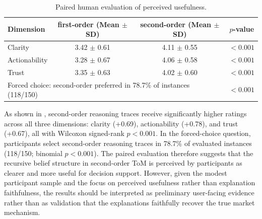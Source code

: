 \documentclass[a4paper,fleqn,doubleblind]{cas-sc}
\begin{document}
\begin{table}[htbp]
\centering
\small
\renewcommand{\arraystretch}{0.8}
\caption{Paired human evaluation of perceived usefulness.}
\begin{tabular}{lccc}
\toprule
\textbf{Dimension} & \textbf{first-order (Mean $\pm$ SD)} & \textbf{second-order (Mean $\pm$ SD)} & \textbf{$p$-value} \\
\midrule
Clarity      & 3.42 $\pm$ 0.61 & 4.11 $\pm$ 0.55 & $<0.001$ \\
Actionability & 3.28 $\pm$ 0.67 & 4.06 $\pm$ 0.58 & $<0.001$ \\
Trust         & 3.35 $\pm$ 0.63 & 4.02 $\pm$ 0.60 & $<0.001$ \\
\midrule
\multicolumn{3}{l}{Forced choice: second-order preferred in 78.7\% of instances (118/150)} & $<0.001$ \\
\bottomrule
\end{tabular}
\label{tab:user_study}
\end{table}

As shown in , second-order reasoning traces receive significantly higher ratings across all three dimensions: clarity (+0.69), actionability (+0.78), and trust (+0.67), all with Wilcoxon signed-rank $p<0.001$. In the forced-choice question, participants select second-order reasoning traces in 78.7\% of evaluated instances (118/150; binomial $p<0.001$). The paired evaluation therefore suggests that the recursive belief structure in second-order ToM is perceived by participants as clearer and more useful for decision support. However, given the modest participant sample and the focus on perceived usefulness rather than explanation faithfulness, the results should be interpreted as preliminary user-facing evidence rather than as validation that the explanations faithfully recover the true market mechanism.
\end{document}

